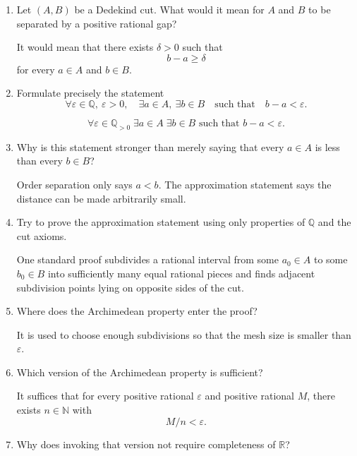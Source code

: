 \documentclass{self-check}
\begin{document}
\begin{enumerate}[label=\arabic{*}., itemsep=10pt]
  \item Let \((A,B)\) be a Dedekind cut. What would it mean for \(A\) and \(B\) to be separated by a positive rational gap?

    \begin{answer}
      It would mean that there exists \(\delta>0\) such that
      \[ b-a\ge\delta \]
      for every \(a\in A\) and \(b\in B\).
    \end{answer}
  \item Formulate precisely the statement
    \[ \forall\varepsilon\in\mathbb{Q},\ \varepsilon>0, \quad \exists a\in A,\ \exists b\in B \quad\text{such that}\quad b-a<\varepsilon. \]

    \begin{answer}
      \[ \forall\varepsilon\in\mathbb{Q}_{>0}\; \exists a\in A\;\exists b\in B \text{ such that }b-a<\varepsilon. \]
    \end{answer}
  \item Why is this statement stronger than merely saying that every \(a\in A\) is less than every \(b\in B\)?

    \begin{answer}
      Order separation only says \(a<b\). The approximation statement says the distance can be made arbitrarily small.
    \end{answer}
  \item Try to prove the approximation statement using only properties of \(\mathbb{Q}\) and the cut axioms.

    \begin{answer}
      One standard proof subdivides a rational interval from some \(a_{0}\in A\) to some \(b_{0}\in B\) into sufficiently many equal rational pieces and finds adjacent subdivision points lying on opposite sides of the cut.
    \end{answer}
  \item Where does the Archimedean property enter the proof?

    \begin{answer}
      It is used to choose enough subdivisions so that the mesh size is smaller than \(\varepsilon\).
    \end{answer}
  \item Which version of the Archimedean property is sufficient?

    \begin{answer}
      It suffices that for every positive rational \(\varepsilon\) and positive rational \(M\), there exists \(n\in\mathbb{N}\) with
      \[ M/n<\varepsilon. \]
    \end{answer}
  \item Why does invoking that version not require completeness of \(\mathbb{R}\)?


\end{enumerate}
\end{document}
